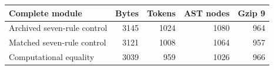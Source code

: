 \begin{tabular}{@{}lrrrr@{}}
\toprule
Complete module & Bytes & Tokens & AST nodes & Gzip 9 \\
\midrule
Archived seven-rule control & 3145 & 1024 & 1080 & 964 \\
Matched seven-rule control & 3121 & 1008 & 1064 & 957 \\
Computational equality & 3039 & 959 & 1026 & 966 \\
\bottomrule
\end{tabular}
